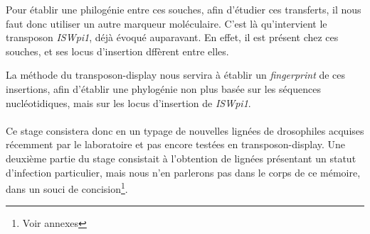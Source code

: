 Pour établir une philogénie entre ces souches, afin d’étudier ces transferts, il nous faut donc utiliser un autre marqueur moléculaire. C’est là qu’intervient le transposon \textit{ISWpi1}, déjà évoqué auparavant.
En effet, il est présent chez ces souches, et ses locus d’insertion dffèrent entre elles.

La méthode du transposon-display nous servira à établir un \textit{fingerprint} %
de ces insertions, afin d’établir une phylogénie non plus basée sur les séquences nucléotidiques, mais sur les locus d’insertion de \textit{ISWpi1}.

\paragraph{} %
\label{par:Sujet}
Ce stage consistera donc en un typage de nouvelles lignées de drosophiles acquises récemment par le laboratoire et pas encore testées en transposon-display. Une deuxième partie du stage consistait à l’obtention de lignées  présentant un statut d'infection particulier, mais nous n'en parlerons pas dans le corps de ce mémoire, dans un souci de concision\footnote{Voir annexes}.
